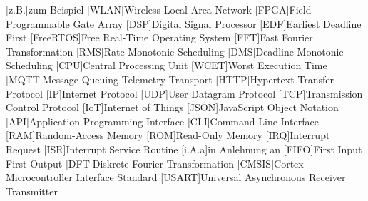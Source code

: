 \documentclass[../EDF Master Thesis.tex]{subfiles}
\begin{document}
    \begin{acronym}[abkuerzungen]
        [z.B.]{zum Beispiel}
        [WLAN]{Wireless Local Area Network}
        [FPGA]{Field Programmable Gate Array}
        [DSP]{Digital Signal Processor}
        [EDF]{Earliest Deadline First}
        [FreeRTOS]{Free Real-Time Operating System}
        [FFT]{Fast Fourier Transformation}
        [RMS]{Rate Monotonic Scheduling}
        [DMS]{Deadline Monotonic Scheduling}
        [CPU]{Central Processing Unit}
        [WCET]{Worst Execution Time}
        [MQTT]{Message Queuing Telemetry Transport}
        [HTTP]{Hypertext Transfer Protocol}
        [IP]{Internet Protocol}
        [UDP]{User Datagram Protocol}
        [TCP]{Transmission Control Protocol}
        [IoT]{Internet of Things}
        [JSON]{JavaScript Object Notation}
        [API]{Application Programming Interface}
        [CLI]{Command Line Interface}
        [RAM]{Random-Access Memory}
        [ROM]{Read-Only Memory}
        [IRQ]{Interrupt Request}
        [ISR]{Interrupt Service Routine}
        [i.A.a]{in Anlehnung an}
        [FIFO]{First Input First Output}
        [DFT]{Diskrete Fourier Transformation}
        [CMSIS]{Cortex Microcontroller Interface Standard}
        [USART]{Universal Asynchronous Receiver Transmitter}
	\end{acronym}
\end{document}
